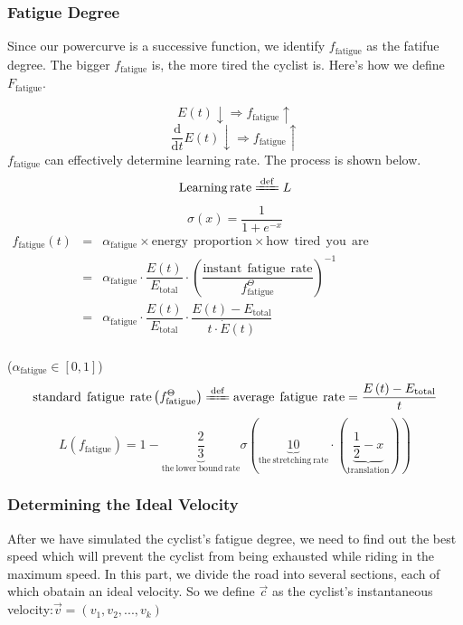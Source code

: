 \documentclass[12pt]{article}
\theoremstyle{definition}
\theoremstyle{remark}
\numberwithin{equation}{section}
\begin{document}
	\subsubsection{Fatigue Degree}
	Since our powercurve is a successive function, we identify $f_{\mathrm{fatigue}}$ as the fatifue degree. The bigger $f_{\mathrm{fatigue}}$ is, the more tired the cyclist is. Here's how we define $F_\mathrm{fatigue}$.

	$$E(t)\downarrow\Rightarrow f_{\mathrm{fatigue}}\uparrow$$
    $$\dfrac{\mathrm{d}}{\mathrm{d}t}E(t)\downarrow\Rightarrow f_{\mathrm{fatigue}}\uparrow$$
	$f_\mathrm{fatigue}$ can effectively determine learning rate.
	 The process is shown below.
  	$$\mathrm{Learning\,rate}\xlongequal{\mathrm{def}}L$$
    $$\sigma \left( x \right) =\dfrac{1}{1+e^{-x}}$$
    $\begin{array}{ccc}
		f_\mathrm{fatigue}\left(t\right)&=&\alpha_{\mathrm{fatigue}}\times \mathrm{energy}\:\:\mathrm{proportion}\times \mathrm{how}\:\:\mathrm{tired}\:\:\mathrm{you}\:\:\mathrm{are}\\
     	\ &=&\alpha_\mathrm{fatigue}\cdot \dfrac{E(t)}{E_\mathrm{total}}\cdot \left( \dfrac{\mathrm{instant}\:\:\mathrm{fatigue}\:\:\mathrm{rate}}{f_\mathrm{fatigue}^{\Theta}}\right)^{-1}\\
    	\ &=&\alpha_{\mathrm{fatigue}}\cdot \dfrac{E\left( t \right)}{E_{\mathrm{total}}}\cdot \dfrac{E\left( t \right) -E_{\mathrm{total}}}{t\cdot \dot{E}\left( t \right)}\\
	\end{array}$

     ($\alpha _{\mathrm{fatigue}}\in \left[ 0,1 \right] $)
     $$\mathrm{standard}\:\:\mathrm{fatigue}\:\:\mathrm{rate}\left( f_{\mathrm{fatigue}}^{\Theta} \right) \xlongequal{\mathrm{def}}\mathrm{average}\:\:\mathrm{fatigue}\:\:\mathrm{rate}=\dfrac{E\left( t \right) -E_{\mathrm{total}}}{t}
      $$
    $$L\left( f_{\mathrm{fatigue}} \right) =1-\underset{\mathrm{the}\:\mathrm{lower}\:\mathrm{bound}\:\mathrm{rate}}{\underbrace{\dfrac{2}{3}}}\sigma \left( \underset{\mathrm{the}\:\mathrm{stretching}\:\mathrm{rate}}{\underbrace{10}}\cdot \left( \underset{\mathrm{translation}}{\underbrace{\dfrac{1}{2}-x}} \right) \right) $$
     \subsubsection{Determining the Ideal Velocity}
	 After we have simulated the cyclist's fatigue degree, we need to find out the best speed which will prevent the cyclist from being exhausted while riding in the maximum speed. In this part, we divide the road into several sections, each of which obatain an ideal velocity. So we define $\vec{c}$ as the cyclist's instantaneous velocity:$\vec{v}=\left( v_1,v_2,...,v_k \right)$
\end{document}
